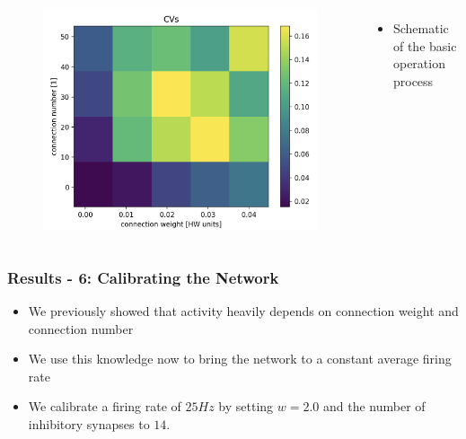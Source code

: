 \documentclass{beamer}
\begin{document}
\begin{frame}
\begin{columns}
          \begin{figure}
    				\centering
    				\includegraphics[width=\linewidth]{figures/CV_sweep.png}
 		   \end{figure}
 		   \begin{itemize}
          		\item Schematic of the basic operation process
          	\end{itemize}

	\end{columns}

\end{frame}

\begin{frame}
	\frametitle{Results - 6: Calibrating the Network}
	\begin{itemize}
		\item We previously showed that activity heavily depends on connection weight 
		and connection number
		\item We use this knowledge now to bring the network to a constant average 
		firing rate
		\item We calibrate a firing rate of $25Hz$ by setting $w=2.0$ and the number 
		of inhibitory synapses to $14$.
	\end{itemize}
\end{frame}
\end{document}
